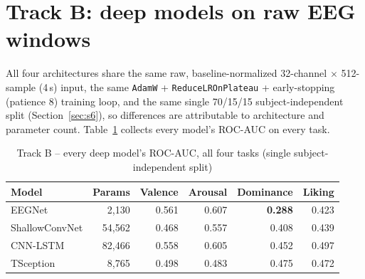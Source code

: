 \documentclass[11pt]{report}
\begin{document}
\section{Track B: deep models on raw EEG windows}
\label{sec:ma-trackb}
All four architectures share the same raw, baseline-normalized 32-channel
$\times$ 512-sample (4\,s) input, the same \texttt{AdamW} +
\texttt{ReduceLROnPlateau} + early-stopping (patience 8) training loop, and
the same single 70/15/15 subject-independent split (Section~\ref{sec:s6}),
so differences are attributable to architecture and parameter count.
Table~\ref{tab:ma-trackb-auc} collects every model's ROC-AUC on every task.

\begin{table}[H]
\centering
\caption{Track B -- every deep model's ROC-AUC, all four tasks (single
subject-independent split)}
\label{tab:ma-trackb-auc}
\begin{tabular}{lrrrrr}
\toprule
Model & Params & Valence & Arousal & Dominance & Liking \\
\midrule
EEGNet         & 2{,}130  & 0.561 & 0.607 & \textbf{0.288} & 0.423 \\
ShallowConvNet & 54{,}562 & 0.468 & 0.557 & 0.408 & 0.439 \\
CNN-LSTM       & 82{,}466 & 0.558 & 0.605 & 0.452 & 0.497 \\
TSception      & 8{,}765  & 0.498 & 0.483 & 0.475 & 0.472 \\
\bottomrule
\end{tabular}
\end{table}
\end{document}
